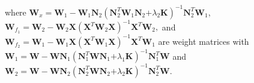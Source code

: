 \documentclass[12pt, notitlepage]{article}
\begin{document}
where 
$ \boldsymbol W_x =
 \boldsymbol W_1 
 -
\boldsymbol W_1 \boldsymbol N_2 
 (\boldsymbol N_2^T  \boldsymbol W_1 \boldsymbol N_2 \boldsymbol 
 + \lambda_2 \boldsymbol K)^{-1} 
 \boldsymbol N_2^T  \boldsymbol W_1$, 
 $\boldsymbol W_{f_1}  =  \boldsymbol W_2 - \boldsymbol W_2\boldsymbol X(\boldsymbol X^T  \boldsymbol W_2\boldsymbol X)^{-1}  \boldsymbol X^T  \boldsymbol W_2,$
 and 
 $\boldsymbol W_{f_2}  =  \boldsymbol W_1 - \boldsymbol W_1\boldsymbol X(\boldsymbol X^T  \boldsymbol W_1\boldsymbol X)^{-1}  \boldsymbol X^T  \boldsymbol W_1$ are weight matrices
 with
 $ \boldsymbol W_1 =
 \boldsymbol W 
 -
\boldsymbol W \boldsymbol N_1 
 (\boldsymbol N_1^T  \boldsymbol W \boldsymbol N_1 \boldsymbol 
 + \lambda_1 \boldsymbol K)^{-1} 
 \boldsymbol N_1^T  \boldsymbol W$
 and
 $ \boldsymbol W_2 =
 \boldsymbol W 
 -
\boldsymbol W \boldsymbol N_2 
 (\boldsymbol N_2^T  \boldsymbol W \boldsymbol N_2 \boldsymbol 
 + \lambda_2 \boldsymbol K)^{-1} 
 \boldsymbol N_2^T  \boldsymbol W$.

\end{document}
